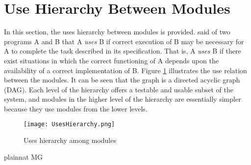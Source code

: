 \documentclass[12pt, titlepage]{article}
\begin{document}
	\section{Use Hierarchy Between Modules} \label{SecUse}
	In this section, the uses hierarchy between modules is provided. 
	\citet{Parnas1978} said of two programs A and B that A {\em uses} B if 
	correct execution of B may be necessary for A to complete the task 
	described in its specification. That is, A {\em uses} B if there exist 
	situations in which the correct functioning of A depends upon the 
	availability of a correct implementation of B.  Figure \ref{FigUH} 
	illustrates the use relation between the modules. It can be seen that the 
	graph is a directed acyclic graph (DAG). Each level of the hierarchy offers 
	a testable and usable subset of the system, and modules in the higher level 
	of the hierarchy are essentially simpler because they use modules from the 
	lower levels.
	\begin{figure}[H]
		\centering
		\texttt{[image: UsesHierarchy.png]}
		\caption{Uses hierarchy among modules}
		\label{FigUH}
	\end{figure}
	 {plainnat}
	 {MG}
\end{document}

